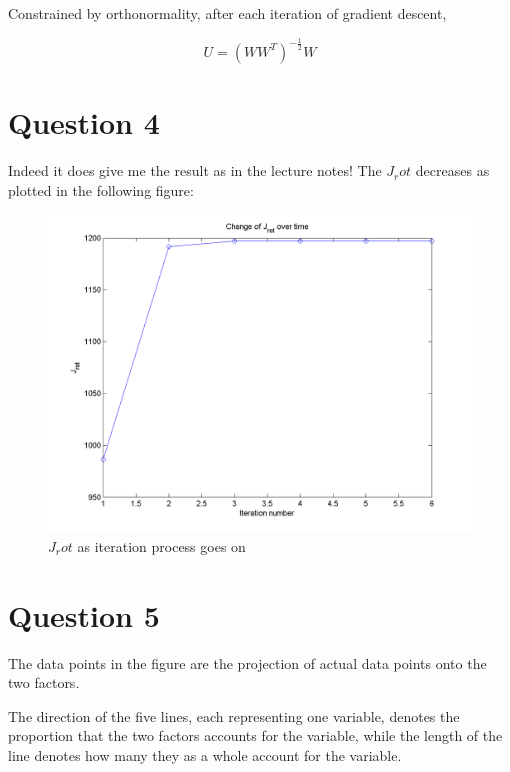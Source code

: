 \documentclass[paper=a4, fontsize=11pt]{scrartcl} %
\numberwithin{equation}{section} %
\numberwithin{figure}{section} %
\numberwithin{table}{section} %
\begin{document}
Constrained by orthonormality, after each iteration of gradient descent, 

\[U=(W W^T)^{-\frac {1} {2}}W \]


\section {Question 4}

Indeed it does give me the result as in the lecture notes! The $J_rot$ decreases as plotted in the following figure:

\begin{figure}[H]
  \centering
  \includegraphics[scale=.7]{J_rot}
  \caption{$J_rot$ as iteration process goes on}
\end{figure}


\section {Question 5}

The data points in the figure are the projection of actual data points onto the two factors.

The direction of the five lines, each representing one variable, denotes the proportion that the two factors accounts for the variable, while the length of the line denotes how many they as a whole account for the variable.
\end{document}

